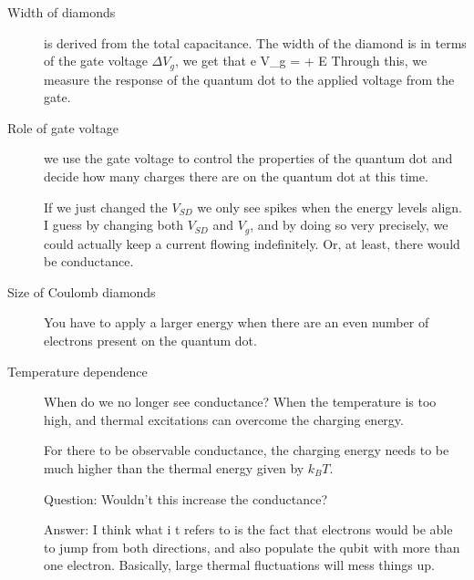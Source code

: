 \begin{description}
\item[Width of diamonds] is derived from the total capacitance. The width of the diamond is in terms of the gate voltage $\Delta V_g$, we get that
\beq
e \Delta V_g  =  + \Delta E
\eeq
Through this, we measure the response of the quantum dot to the applied voltage from the gate. 

\item[Role of gate voltage] we use the gate voltage to control the properties of the quantum dot and decide how many charges there are on the quantum dot at this time. 

If we just changed the $V_{SD}$ we only see spikes when the energy levels align. I guess by changing both $V_{SD}$ and $V_g$, and by doing so  very precisely, we could actually keep a current flowing indefinitely. Or, at least, there would be conductance. 

\item[Size of Coulomb diamonds] You have to apply a larger energy when there are an even number of electrons present on the quantum dot. 


\item[Temperature dependence] When do we no longer see conductance? When the temperature is too high, and thermal excitations can overcome the charging energy. 

For there to be observable conductance, the charging energy needs to be much higher than the thermal energy given by $k_B T$. 

Question: Wouldn't this increase the conductance? 

Answer: I think what i t refers to is the fact that electrons would be able to jump from both directions, and also populate the qubit with more than one electron. Basically, large thermal fluctuations will mess things up. 

\end{description}
